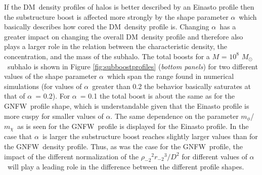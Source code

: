 \documentclass[aps,prd,twocolumn,amsmath,amssymb,floatfix,nofootinbib,10pt]{revtex4}
\newcommand{\NFW}{NFW}
\newcommand{\GNFW}{G\NFW}
\newcommand{\DM}{DM}
\newcommand{\mdm}{\ensuremath{m_{\chi}}}
\newcommand{\mv}{\ensuremath{m_{\phi}}}
\newcommand{\dist}{\ensuremath{D}}
\newcommand{\rhominustwo}{\ensuremath{\rho_{-2}}}
\newcommand{\rminustwo}{\ensuremath{r_{-2}}}
\newcommand{\alphaEinasto}{\ensuremath{\alpha}}
\newcommand{\Msol}{\ensuremath{M_{\odot}}}
\newcommand{\Msun}{\Msol}
\begin{document}
If the \DM\ density profiles of halos is better described by an
Einasto profile then the substructure boost is affected more strongly
by the shape parameter \alphaEinasto\, which basically describes how
cored the \DM\ density profile is. Changing \alphaEinasto\ has a
greater impact on changing the overall \DM\ density profile and
therefore also plays a larger role in the relation between the
characteristic density, the concentration, and the mass of the
subhalo. The total boosts for a $M$ = $10^8$ \Msun\ subhalo is shown
in Figure \ref{fig:subboostprofiles} (\emph{bottom panels}) for two
different values of the shape parameter \alphaEinasto\, which span the
range found in numerical simulations (for values of \alphaEinasto\
greater than 0.2 the behavior basically saturates at that of
\alphaEinasto\ = 0.2). For \alphaEinasto\ = 0.1 the total boost is
about the same as for the \GNFW\ profile shape, which is
understandable given that the Einasto profile is more cuspy for
smaller values of \alphaEinasto. The same dependence on the parameter
\mv/\mdm\ as is seen for the \GNFW\ profile is displayed for the
Einasto profile. In the case that \alphaEinasto\ is larger the
substructure boost reaches slightly larger values than for the \GNFW\
density profile. Thus, as was the case for the \GNFW\ profile, the
impact of the different normalization of the
$\rhominustwo^2\rminustwo^3/\dist^2$ for different values of
\alphaEinasto\ will play a leading role in the difference between the
different profile shapes.
\end{document}
